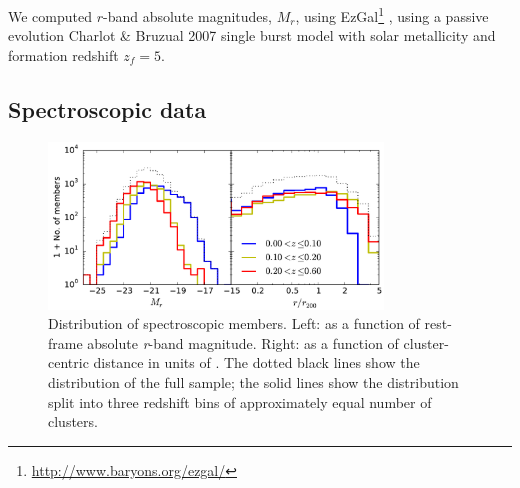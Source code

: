 We computed $r$-band absolute magnitudes, $M_r$, using 
EzGal\footnote{\url{http://www.baryons.org/ezgal/}} \citep{mancone12}, using a passive evolution 
Charlot \& Bruzual 2007 \citep[unpublished, see][]{bruzual03} single burst model with solar 
metallicity and formation redshift $z_f=5$.

\subsection{Spectroscopic data}

\begin{figure}
 \centerline{\includegraphics[width=3.5in]{chapter4/member-coverage.pdf}}
\caption{\small Distribution of spectroscopic members. Left: as a function of rest-frame 
absolute {\it r}-band magnitude. Right: as a function of cluster-centric distance in units 
of \radius. The dotted black lines show the distribution of the full sample; the solid lines show 
the distribution split into three redshift bins of approximately equal number of clusters.}
\label{f:coverage}
\end{figure}

